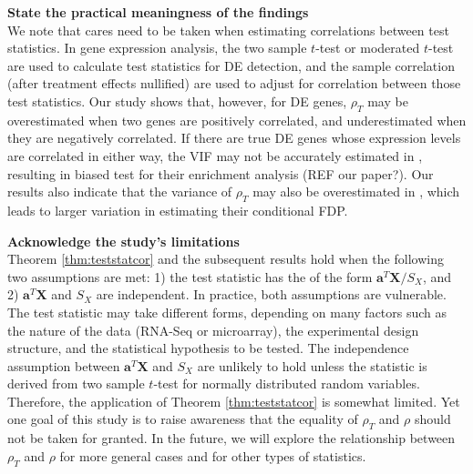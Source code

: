 \documentclass[12pt, a4paper]{article}
\begin{document}
	\textbf{State the practical meaningness of the findings}\\
	We note that cares need to be taken when estimating correlations between test statistics.
	In gene expression analysis, the two sample $t$-test \citep{barry2008statistical, 
	efron2007correlation,qiu2005correlation} or moderated 
	$t$-test \citep{wu2012camera} are used to calculate test statistics for DE detection, and the 
	sample correlation (after treatment effects 
	nullified) are used to adjust for correlation between those test statistics.
	Our study shows that, however, for DE genes, $\rho_T$ may be overestimated when
	two genes are positively correlated, and underestimated when they are negatively correlated. If 
	there are true DE genes whose expression 
	levels are correlated in either way, the VIF may not be accurately estimated in 
	\cite{wu2012camera}, resulting in biased test
	for their enrichment analysis (REF our paper?). Our results also indicate that the variance of 
	$\rho_T$ may also be overestimated in
	\cite{efron2007correlation}, which leads to larger variation in estimating their conditional 
	FDP.
	
	\textbf{	Acknowledge the study’s limitations \\}
	Theorem \ref{thm:teststatcor} and the subsequent results hold when the following two 
	assumptions are met: 1) the test statistic has the of 
	the form $\bm a^T\bm X/S_X$, and 2) $\bm a^T\bm X$ and $S_X$ are independent. In practice, both 
	assumptions are vulnerable.
	The test statistic may take different forms, depending on many factors such as the nature of 
	the data (RNA-Seq or microarray), the 
	experimental design structure, and the statistical hypothesis to be tested. The independence 
	assumption between $\bm a^T\bm X$ and $S_X$ are 
	unlikely to hold unless the statistic is derived from two sample $t$-test for normally 
	distributed random variables. Therefore, the 
	application of Theorem \ref{thm:teststatcor} is somewhat limited. Yet one goal of this study is 
	to raise awareness that the equality of $\rho_T$ 
	and $\rho$ should not be taken for granted. In the future, we will explore the relationship 
	between $\rho_T$ and $\rho$ for more general cases and for other types of statistics. 
	
	
	
	\newpage

	
	
	
	
\end{document}
